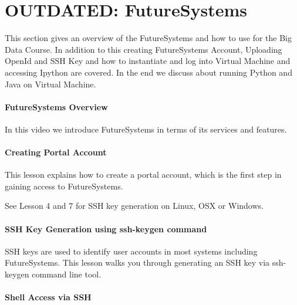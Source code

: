 \FILENAME

\chapter{OUTDATED: FutureSystems}
\label{C:futuresystems}


This section gives an overview of the FutureSystems and how
to use for the Big Data Course. In addition to this creating
FutureSystems Account, Uploading OpenId and SSH Key and how to
instantiate and log into Virtual Machine and accessing Ipython are
covered. In the end we discuss about running Python and Java on Virtual
Machine.

\subsubsection{FutureSystems Overview}

In this video we introduce FutureSystems in terms of its services and
features.


\subsubsection{Creating Portal Account}

This lesson explains how to create a portal account, which is the first
step in gaining access to FutureSystems.

See Lesson 4 and 7 for SSH key generation on Linux, OSX or Windows.


\subsubsection{SSH Key Generation using ssh-keygen command}
\label{ssh-key-generation-using-ssh-keygen-command}

SSH keys are used to identify user accounts in most systems including
FutureSystems. This lesson walks you through generating an SSH key via
ssh-keygen command line tool.


\subsubsection{Shell Access via SSH}

